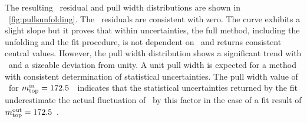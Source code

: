 %
The resulting \mt\ residual and pull width distributions are shown in \fig~\ref{fig:pullsunfolding}.
%
The \mt\ residuals are consistent with zero. The curve exhibits a slight slope but it proves that within uncertainties, the full method, including the unfolding and the fit procedure, is not dependent on \mt\ and returns consistent central values.
%
However, the pull width distribution shows a significant trend with \mt\ and a sizeable deviation from unity. A unit pull width is expected for a method with consistent determination of statistical uncertainties. The pull width value of \UnfStatScaleFac\ for $m_{\mathrm{top}}^{\mathrm{in}}=172.5$~\GeV\ indicates that the statistical uncertainties returned by the fit underestimate the actual fluctuation of \mt\ by this factor in the case of a fit result of $m_{\mathrm{top}}^{\mathrm{out}}=172.5$~\GeV.
%
